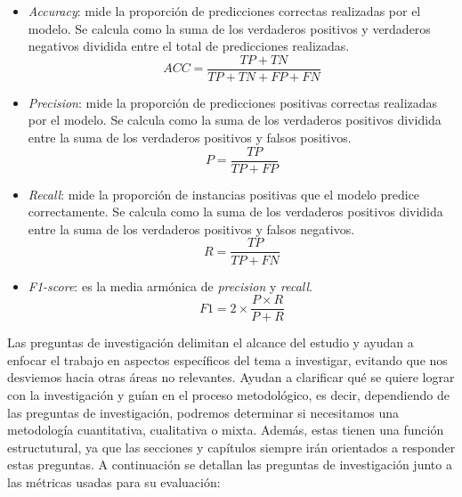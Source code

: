 \begin{itemize}
    \item \textit{Accuracy}: mide la proporción de predicciones correctas realizadas por el
          modelo. Se calcula como la suma de los verdaderos positivos y verdaderos negativos
          dividida entre el total de predicciones realizadas.
            \begin{equation}
                  ACC = \frac{TP + TN}{TP + TN + FP + FN}
            \end{equation}
    \item \textit{Precision}: mide la proporción de predicciones positivas correctas realizadas
          por el modelo. Se calcula como la suma de los verdaderos positivos dividida entre la
          suma de los verdaderos positivos y falsos positivos.
            \begin{equation}
                  P = \frac{TP}{TP + FP}
            \end{equation}
    \item \textit{Recall}: mide la proporción de instancias positivas que el modelo predice
          correctamente. Se calcula como la suma de los verdaderos positivos dividida entre la
          suma de los verdaderos positivos y falsos negativos.
            \begin{equation}
                  R = \frac{TP}{TP + FN}
            \end{equation}
    \item \textit{F1-score}: es la media armónica de \textit{precision} y \textit{recall}.
            \begin{equation}
                  F1 = 2 \times \frac{P \times R}{P + R}
            \end{equation}
\end{itemize}

Las preguntas de investigación delimitan el alcance del estudio y ayudan a enfocar el trabajo en
aspectos específicos del tema a investigar, evitando que nos desviemos hacia otras áreas no
relevantes. Ayudan a clarificar qué se quiere lograr con la investigación y guían en el proceso
metodológico, es decir, dependiendo de las preguntas de investigación, podremos determinar
si necesitamos una metodología cuantitativa, cualitativa o mixta. Además, estas tienen una
función estructutural, ya que las secciones y capítulos siempre irán orientados a responder
estas preguntas. A continuación se detallan las preguntas de investigación junto a las
métricas usadas para su evaluación:


